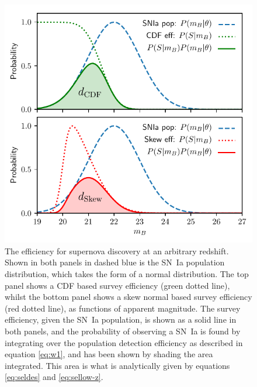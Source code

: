 \documentclass[twocolumn,trackchanges,tighten]{aastex62}
\begin{document}
\begin{figure}
	\begin{center}
		\includegraphics[width=\columnwidth]{efficiency.pdf}
	\end{center}
	\caption{The efficiency for supernova discovery at an arbitrary redshift. Shown in both panels in dashed blue is the SN~Ia population distribution, which takes the form of a normal distribution. The top panel shows a CDF based survey efficiency (green dotted line), whilst the bottom panel shows a skew normal based survey efficiency (red dotted line), as functions of apparent magnitude. The survey efficiency, given the SN~Ia population, is shown as a solid line in both panels, and the probability of observing a SN~Ia is found by integrating over the population detection efficiency as described in equation \eqref{eq:w1}, and has been shown by shading the area integrated. This area is what is analytically given by equations \eqref{eq:seldes} and \eqref{eq:sellow-z}.}
	\label{fig:efficiency}
\end{figure}
\end{document}
